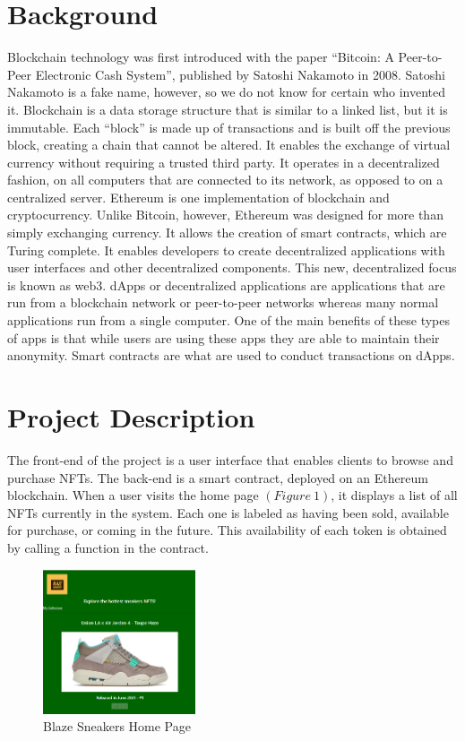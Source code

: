 \documentclass{article}
\begin{document}
\section{Background}
    Blockchain technology was first introduced with the paper ``Bitcoin: A Peer-to-Peer Electronic Cash System'', 
    published by Satoshi Nakamoto in 2008.
    Satoshi Nakamoto is a fake name, however, so we do not know for certain who invented it.
    Blockchain is a data storage structure that is similar to a linked list, but it is immutable.
    Each ``block'' is made up of transactions and is built off the previous block, creating a chain that cannot be altered.
    It enables the exchange of virtual currency without requiring a trusted third party.
    It operates in a decentralized fashion, on all computers that are connected to its network, 
    as opposed to on a centralized server.
    \newline
    \indent
    Ethereum is one implementation of blockchain and cryptocurrency.
    Unlike Bitcoin, however, Ethereum was designed for more than simply exchanging currency. 
    It allows the creation of smart contracts, which are Turing complete. 
    It enables developers to create decentralized applications with user interfaces and other decentralized components.
    This new, decentralized focus is known as web3.
    \newline
    \indent
    dApps or decentralized applications are applications that are run from a blockchain network or peer-to-peer networks whereas many normal applications run from a single computer. One of the main benefits of these types of apps is that while users are using these apps they are able to maintain their anonymity. Smart contracts are what are used to conduct transactions on dApps.

\section{Project Description}
    The front-end of the project is a user interface that enables clients to browse and purchase NFTs.
    The back-end is a smart contract, deployed on an Ethereum blockchain.
    When a user visits the home page $( Figure~1 )$, it displays a list of all NFTs currently in the system. 
    Each one is labeled as having been sold, available for purchase, or coming in the future.
    This availability of each token is obtained by calling a function in the contract.
    
\begin{figure}[!h]
    \centering
    \includegraphics[width=0.4\textwidth]{HomePage.png}
    \caption{Blaze Sneakers Home Page}
\end{figure}
    
\end{document}
